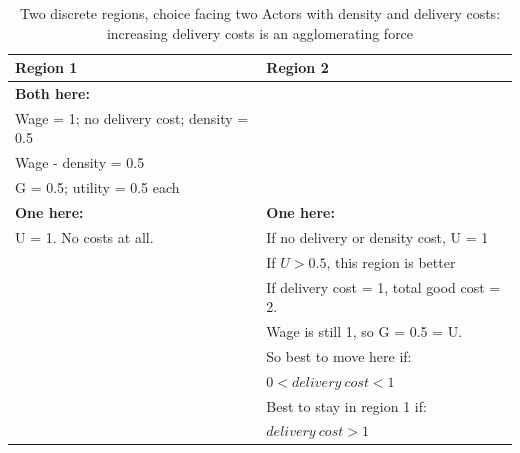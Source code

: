 \renewcommand{\arraystretch}{1.2}
\begin{table}[!hbt]
\begin{center}

\begin{tabular}{|l|l|}
\hline 
\textbf{\large{Region 1}} & \textbf{\large{Region 2}}\\
\hline
\textbf{Both here:} &\\
Wage = 1; no delivery cost; density = 0.5 & \\
Wage - density = 0.5 & \\
G = 0.5; utility = 0.5 each & \\
\hline
\textbf{One here:} & \textbf{One here:}\\
U = 1. No costs at all. & If no delivery or density cost, U = 1\\
& If $U > 0.5$, this region is better\\
& If delivery cost = 1, total good cost = 2.\\
& Wage is still 1, so G = 0.5 = U.\\
& So best to move here if: \\
& $0 < delivery\ cost < 1$\\
& Best to stay in region 1 if:\\
& $delivery\ cost > 1$\\
\hline
\end{tabular}

\caption{Two discrete regions, choice facing two Actors with density and delivery costs: increasing delivery costs is an agglomerating force \label{tab:discretechoicetable1}}
\end{center}
\end{table}


